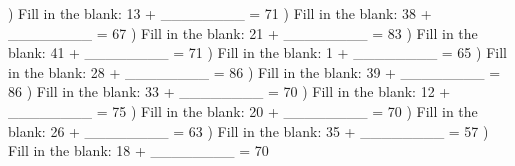 \documentclass{article}%
\begin{document}
\newline%
\newline%
) Fill in the blank: 13 + \_\_\_\_\_\_\_\_ = 71%
\newline%
\newline%
) Fill in the blank: 38 + \_\_\_\_\_\_\_\_ = 67%
\newline%
\newline%
) Fill in the blank: 21 + \_\_\_\_\_\_\_\_ = 83%
\newline%
\newline%
) Fill in the blank: 41 + \_\_\_\_\_\_\_\_ = 71%
\newline%
\newline%
) Fill in the blank: 1 + \_\_\_\_\_\_\_\_ = 65%
\newline%
\newline%
) Fill in the blank: 28 + \_\_\_\_\_\_\_\_ = 86%
\newline%
\newline%
) Fill in the blank: 39 + \_\_\_\_\_\_\_\_ = 86%
\newline%
\newline%
) Fill in the blank: 33 + \_\_\_\_\_\_\_\_ = 70%
\newline%
\newline%
) Fill in the blank: 12 + \_\_\_\_\_\_\_\_ = 75%
\newline%
\newline%
) Fill in the blank: 20 + \_\_\_\_\_\_\_\_ = 70%
\newline%
\newline%
) Fill in the blank: 26 + \_\_\_\_\_\_\_\_ = 63%
\newline%
\newline%
) Fill in the blank: 35 + \_\_\_\_\_\_\_\_ = 57%
\newline%
\newline%
) Fill in the blank: 18 + \_\_\_\_\_\_\_\_ = 70%
\end{document}
